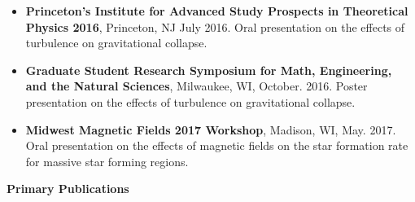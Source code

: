 \documentclass[12pt,notitlepage]{report}
\begin{document}
%		

\bigskip
{}


\begin{itemize}


\item[]{\bf Princeton’s Institute for Advanced Study Prospects in Theoretical Physics 2016}, Princeton, NJ July 2016. Oral presentation on the effects of turbulence on gravitational collapse.

\item[]{\bf Graduate Student Research Symposium for Math, Engineering, and the Natural Sciences}, Milwaukee, WI, October. 2016. Poster presentation on the effects of turbulence on gravitational collapse.

\item[]{\bf Midwest Magnetic Fields 2017 Workshop}, Madison, WI, May. 2017. Oral presentation on the effects of magnetic fields on the star formation rate for massive star forming regions.

\end{itemize}

\bigskip
{}

\textbf{Primary Publications}
\end{document}
